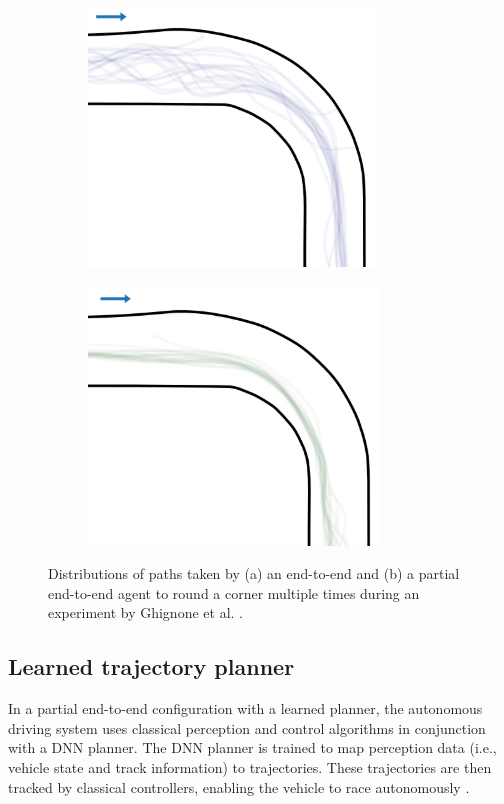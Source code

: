 \begin{figure}[htb!]
    \centering
    \begin{subfigure}[htb!]{0.49\textwidth}
        \centering
        \includegraphics[height=.45\linewidth]{contents/chapt2/figs/TC_end_to_end.png}
        \caption[]{}
        \label{fig:TC_end_to_end}
    \end{subfigure}
    \hfill
    \begin{subfigure}[htb!]{0.49\textwidth}
        \centering
        \includegraphics[height=.45\linewidth]{contents/chapt2/figs/TC_partial.png}
        \caption[]{}
        \label{fig:TC_partial}
    \end{subfigure}
    \hfill
    \caption[Distributions of paths taken by end-to-end and partial end-to-end agents]{Distributions of paths taken by (a) an end-to-end and (b) a partial end-to-end agent to round a corner multiple times during an experiment by Ghignone et al. \cite{Ghignone2022}.}
\label{fig:TC}
\end{figure}

\subsection{Learned trajectory planner}
\label{sec:learned_planner}

In a partial end-to-end configuration with a learned planner, the autonomous driving system uses classical perception and control algorithms in conjunction with a DNN planner. 
The DNN planner is trained to map perception data (i.e., vehicle state and track information) to trajectories. 
These trajectories are then tracked by classical controllers, enabling the vehicle to race autonomously \cite{Betz2021}.

